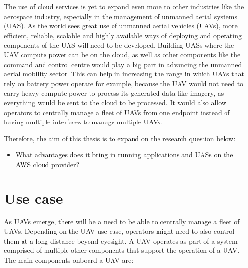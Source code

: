 The use of cloud services is yet to expand even more to other industries like the aerospace industry, especially in the management of unmanned aerial systems (UAS). As the world sees great use of unmanned aerial vehicles (UAVs), more efficient, reliable, scalable and highly available ways of deploying and operating components of the UAS will need to be developed. Building UASs where the UAV compute power can be on the cloud, as well as other components like the command and control centre would play a big part in advancing the unmanned aerial mobility sector. This can help in increasing the range in which UAVs that rely on battery power operate for example, because the UAV would not need to carry heavy compute power to process its generated data like imagery, as everything would be sent to the cloud to be processed. It would also allow operators to centrally manage a fleet of UAVs from one endpoint instead of having multiple interfaces to manage multiple UAVs.

Therefore, the aim of this thesis is to expand on the research question below:

\begin{itemize}
    \item What advantages does it bring in running applications and UASs on the AWS cloud provider?
\end{itemize}




\section{Use case}
\label{sec:use-case}

As UAVs emerge, there will be a need to be able to centrally manage a fleet of UAVs. Depending on the UAV use case, operators might need to also control them at a long distance beyond eyesight. A UAV operates as part of a system comprised of multiple other components that support the operation of a UAV. The main components onboard a UAV are:

